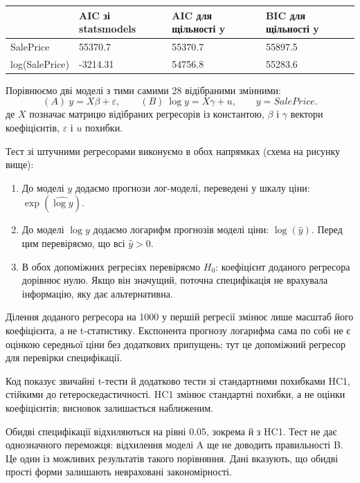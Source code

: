\begingroup\fontsize{7.5}{9.5}\selectfont\setlength{\tabcolsep}{2.5mm}\renewcommand{\arraystretch}{1.15}
\par\vspace{2pt}\noindent\begin{tabular}{|llll|}
\hline
 & AIC зі statsmodels & AIC для щільності y & BIC для щільності y \\
\hline
SalePrice & 55370.7 & 55370.7 & 55897.5 \\
log(SalePrice) & -3214.31 & 54756.8 & 55283.6 \\
\hline
\end{tabular}\par\vspace{2pt}
\endgroup


\answerheading
Порівнюємо дві моделі з тими самими 28 відібраними змінними:
\[(A)\ y=X\beta+\varepsilon,\qquad (B)\ \log y=X\gamma+u,\qquad y=SalePrice.\]
де \(X\) позначає матрицю відібраних регресорів із константою, \(\beta\)
і \(\gamma\) вектори коефіцієнтів, \(\varepsilon\) і \(u\) похибки.

Тест зі штучними регресорами виконуємо в обох напрямках (схема на
рисунку вище):

\begin{enumerate}
\def\labelenumi{\arabic{enumi}.}
\item
  До моделі \(y\) додаємо прогнози лог-моделі, переведені у шкалу ціни:
  \(\exp(\widehat{\log y})\).
\item
  До моделі \(\log y\) додаємо логарифм прогнозів моделі ціни:
  \(\log(\widehat y)\). Перед цим перевіряємо, що всі \(\widehat y>0\).
\item
  В обох допоміжних регресіях перевіряємо \(H_0\): коефіцієнт доданого
  регресора дорівнює нулю. Якщо він значущий, поточна специфікація не
  врахувала інформацію, яку дає альтернативна.
\end{enumerate}

Ділення доданого регресора на 1000 у першій регресії змінює лише масштаб
його коефіцієнта, а не t-статистику. Експонента прогнозу логарифма сама
по собі не є оцінкою середньої ціни без додаткових припущень; тут це
допоміжний регресор для перевірки специфікації.

Код показує звичайні t-тести й додатково тести зі стандартними похибками
HC1, стійкими до гетероскедастичності. HC1 змінює стандартні похибки, а
не оцінки коефіцієнтів; висновок залишається наближеним.

Обидві специфікації відхиляються на рівні 0.05, зокрема й з HC1. Тест не
дає однозначного переможця: відхилення моделі A ще не доводить
правильності B. Це один із можливих результатів такого порівняння. Дані
вказують, що обидві прості форми залишають невраховані закономірності.

